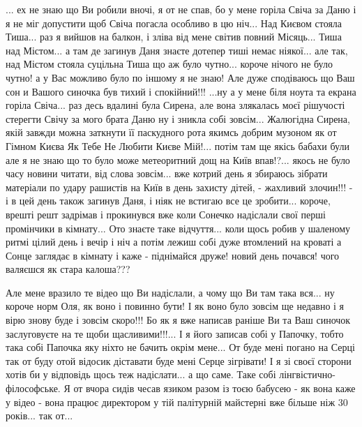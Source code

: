  
 
 
 
 

... ех не знаю що Ви робили вночі, я от не спав, бо у мене горіла Свіча за Даню
і я не міг допустити щоб Свіча погасла особливо в цю ніч... Над Києвом стояла
Тиша...  раз я вийшов на балкон, і зліва від мене світив повний Місяць... Тиша
над Містом...  а там де загинув Даня знаєте дотепер тиші немає ніякої... але
так, над Містом стояла суцільна Тиша що аж було чутно... короче нічого не було
чутно! а у Вас можливо було по іншому я не знаю! Але дуже сподіваюсь що Ваш сон
и Вашого синочка був тихий і спокійний!!!  ...ну а у мене біля ноута та екрана
горіла Свіча... раз десь вдалині була Сирена, але вона злякалась моєї рішучості
стерегти Свічу за мого брата Даню ну і зникла собі зовсім... Жалюгідна Сирена,
якій завжди можна заткнути її паскудного рота якимсь добрим музоном як от
Гімном Києва Як Тебе Не Любити Києве Мій!...  потім там ще якісь бабахи були
але я не знаю що то було може метеоритний дощ на Київ впав!?...  якось не було
часу новини читати, від слова зовсім... вже котрий день я збираюсь зібрати
матеріали по удару рашистів на Київ в день захисту дітей, - жахливий злочин!!!
- і в цей день також загинув Даня, і ніяк не встигаю все це зробити...  короче,
врешті решт задрімав і прокинувся вже коли Сонечко надіслали свої перші
промінчики в кімнату... Ото знаєте таке відчуття...  коли щось робив у шаленому
ритмі цілий день і вечір і ніч а потім лежиш собі дуже втомлений на кроваті а
Сонце заглядає в кімнату і каже - піднімайся друже! новий день почався! чого
валяєшся як стара калоша???

Але мене вразило те відео що Ви надіслали, а чому що Ви там така вся... ну
короче норм Оля, як воно і повинно бути! І як воно було зовсім ще недавно і я
вірю знову буде і зовсім скоро!!! Бо як я вже написав раніше Ви та Ваш синочок
заслуговуєте на те щоби щасливими!!!...  І я його записав собі у Папочку, тобто
така собі Папочка яку ніхто не бачить окрім мене... От буде мені погано на
Серці так от буду отой відосик діставати буде мені Серце зігрівати! І я зі
своєї сторони хотів би у відповідь щось теж надіслати...  а що саме. Таке собі
лінгвістично-філософське. Я от вчора сидів чесав язиком разом із тоєю бабусею -
як вона каже у відео - вона працює директором у тій палітурній майстерні вже
більше ніж 30 років... так от...

